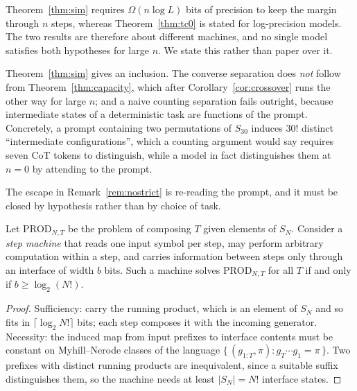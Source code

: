 \begin{remark}
Theorem~\ref{thm:sim} requires $\Omega(n\log L)$ bits of precision to keep the
margin through $n$ steps, whereas Theorem~\ref{thm:tc0} is stated for
log-precision models. The two results are therefore about different machines,
and no single model satisfies both hypotheses for large $n$. We state this
rather than paper over it.
\end{remark}

\begin{remark}
\label{rem:nostrict}
Theorem~\ref{thm:sim} gives an inclusion. The converse separation does
\emph{not} follow from Theorem~\ref{thm:capacity}, which after
Corollary~\ref{cor:crossover} runs the other way for large $n$; and a naive
counting separation fails outright, because intermediate states of a
deterministic task are functions of the prompt. Concretely, a prompt containing
two permutations of $S_{30}$ induces $30!$ distinct ``intermediate
configurations'', which a counting argument would say requires seven CoT tokens
to distinguish, while a model in fact distinguishes them at $n=0$ by attending to
the prompt.
\end{remark}

The escape in Remark~\ref{rem:nostrict} is re-reading the prompt, and it must be
closed by hypothesis rather than by choice of task.

\begin{theorem}
\label{thm:stream}
Let $\mathrm{PROD}_{N,T}$ be the problem of composing $T$ given elements of
$S_N$. Consider a \emph{step machine} that reads one input symbol per step, may
perform arbitrary computation within a step, and carries information between
steps only through an interface of width $b$ bits. Such a machine solves
$\mathrm{PROD}_{N,T}$ for all $T$ if and only if $b \ge \log_2 (N!)$.
\end{theorem}

\begin{proof}
Sufficiency: carry the running product, which is an element of $S_N$ and so fits
in $\lceil \log_2 N!\rceil$ bits; each step composes it with the incoming
generator. Necessity: the induced map from input prefixes to interface contents
must be constant on Myhill--Nerode classes of the language
$\{\,(g_{1:T}, \pi) : g_T\cdots g_1 = \pi\,\}$. Two prefixes with distinct
running products are inequivalent, since a suitable suffix distinguishes them,
so the machine needs at least $|S_N| = N!$ interface states.
\end{proof}

